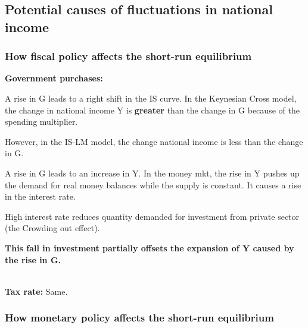 \documentclass[10pt]{article}
\begin{document}
\subsection{Potential causes of fluctuations in national income}

\subsubsection{How fiscal policy affects the short-run equilibrium}
{\textbf {Government purchases:}}

\begin{figure}[H]
\end{figure}



A rise in G leads to a right shift in the IS curve. In the Keynesian Cross model,
the change in national income Y is {\textbf {greater}} than the change in G because of 
the spending multiplier.


However, in the IS-LM model, the change national income is less than the change in G.

A rise in G leads to an increase in Y. In the money mkt, the rise in Y pushes up the
demand for real money balances while the supply is constant. It causes a rise in the
interest rate.

High interest rate reduces quantity demanded for investment from private sector (the Crowding out effect).


{\textbf {This fall in investment partially offsets the expansion of Y caused by the
rise in G.}}



\\
{\textbf {Tax rate:}}
Same.


\subsubsection{How monetary policy affects the short-run equilibrium}














\end{document}
